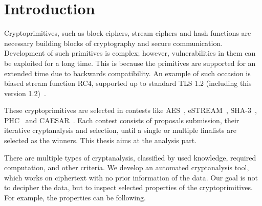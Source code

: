 \documentclass[
  print, %
  Table,   %
  nolof,     %
  nolot,     %
  11pt, %
  oneside  %
]{fithesis3}
\begin{document}
\setlength{\parskip}{5pt}
\setlength{\parindent}{0pt}


\chapter{Introduction}
\label{chap:introduction}


Cryptoprimitives, such as block ciphers, stream ciphers and hash functions are necessary building blocks of cryptography and secure communication. Development of such primitives is complex; however, vulnerabilities in them can be exploited for a long time. This is because the primitives are supported for an extended time due to backwards compatibility. An example of such occasion is biased stream function RC4, supported up to standard TLS 1.2 (including this version 1.2)~\cite{dierks2008transport}.

These cryptoprimitives are selected in contests like AES~\cite{aes-competition}, eSTREAM~\cite{estream-competition}, SHA-3~\cite{sha3-competition}, PHC~\cite{password-hashing-competition} and CAESAR~\cite{caesar-competition}. Each contest consists of proposals submission, their iterative cryptanalysis and selection, until a single or multiple finalists are selected as the winners. This thesis aims at the analysis part.

There are multiple types of cryptanalysis, classified by used knowledge, required computation, and other criteria. We develop an automated cryptanalysis tool, which works on ciphertext with no prior information of the data. Our goal is not to decipher the data, but to inspect selected properties of the cryptoprimitives. For example, the properties can be following.
\end{document}
